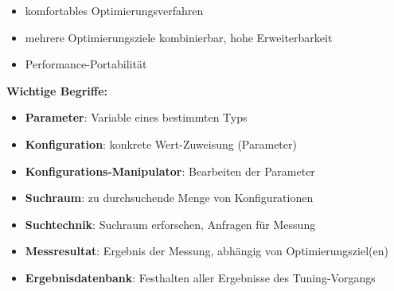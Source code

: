 \begin{frame}
\begin{itemize}
      \end{itemize}
      
    \begin{itemize}
      \item komfortables Optimierungsverfahren
      
      \item mehrere Optimierungsziele kombinierbar, hohe Erweiterbarkeit
      
       \item Performance-Portabilität
                  
    \end{itemize}
    \end{frame}
    \endgroup
    
  \begingroup
  \begin{frame}
    \textbf{Wichtige Begriffe:}
    
  \begin{itemize}

    \item \textbf{Parameter}: Variable eines bestimmten Typs 
    
    \item \textbf{Konfiguration}: konkrete Wert-Zuweisung (Parameter)
    \item \textbf{Konfigurations-Manipulator}: Bearbeiten der Parameter \newline
    
    \item \textbf{Suchraum}: zu durchsuchende Menge von Konfigurationen
    
    \item \textbf{Suchtechnik}: Suchraum erforschen, Anfragen für Messung
    
    \item \textbf{Messresultat}: Ergebnis der Messung, abhängig von Optimierungsziel(en)
    \item \textbf{Ergebnisdatenbank}: Festhalten aller Ergebnisse des Tuning-Vorgangs
    
  \end{itemize}
  \end{frame}
  \endgroup
        
